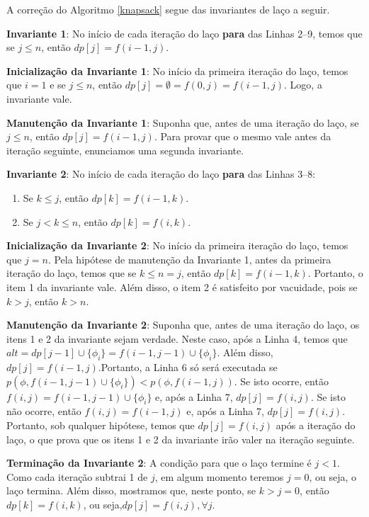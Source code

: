 \indent

A correção do Algoritmo \ref{knapsack} segue das invariantes de laço a seguir.

\textbf{Invariante 1}: No início de cada iteração do laço \textbf{para} das Linhas 2--9, temos que se $j \leq n$, então $dp[j] = f(i-1,j)$.

\textbf{Inicialização da Invariante 1}: No início da primeira iteração do laço, temos que $i = 1$ e se $j \leq n$, então $dp[j] = \emptyset = f(0,j) = f(i-1,j)$. Logo, a invariante vale.

\textbf{Manutenção da Invariante 1}: Suponha que, antes de uma iteração do laço, se $j \leq n$, então $dp[j] = f(i-1,j)$. Para provar que o mesmo vale antes da iteração seguinte, enunciamos uma segunda invariante.

\textbf{Invariante 2}: No início de cada iteração do laço \textbf{para} das Linhas 3--8:
\begin{enumerate}
	\item Se $k \leq j$, então $dp[k] = f(i-1,k)$.
	\item Se $j < k \leq n$, então $dp[k] = f(i,k)$.
\end{enumerate}

\textbf{Inicialização da Invariante 2}: No início da primeira iteração do laço, temos que $j = n$. Pela hipótese de manutenção da Invariante 1, antes da primeira iteração do laço, temos que se $k \leq n = j$, então $dp[k] = f(i-1,k)$. Portanto, o item 1 da invariante vale. Além disso, o item 2 é satisfeito por vacuidade, pois se $k > j$, então $k > n$.

\textbf{Manutenção da Invariante 2}: Suponha que, antes de uma iteração do laço, os itens 1 e 2 da invariante sejam verdade. Neste caso, após a Linha 4, temos que\break $alt = dp[j-1] \cup \{\phi_i \} = f(i-1,j-1) \cup \{\phi_i \}$. Além disso, $dp[j] = f(i-1,j)$.\break Portanto, a Linha 6 só será executada se $p(\phi,f(i-1,j-1) \cup \{\phi_i \}) < p(\phi,f(i-1,j))$. Se isto ocorre, então $f(i,j) = f(i-1,j-1) \cup \{\phi_i \}$ e, após a Linha 7, $dp[j] = f(i,j)$. Se isto não ocorre, então $f(i,j) = f(i-1,j)$ e, após a Linha 7, $dp[j] = f(i,j)$. Portanto, sob qualquer hipótese, temos que $dp[j] = f(i,j)$ após a iteração do laço, o que prova que os itens 1 e 2 da invariante irão valer na iteração seguinte.

\textbf{Terminação da Invariante 2}: A condição para que o laço termine é $j < 1$. Como cada iteração subtrai 1 de $j$, em algum momento teremos $j = 0$, ou seja, o laço termina. Além disso, mostramos que, neste ponto, se $k > j = 0$, então $dp[k] = f(i,k)$, ou seja,\break $dp[j] = f(i,j), \forall j$.

